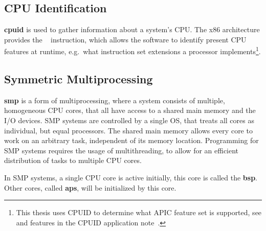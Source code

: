 \subsection{CPU Identification}
\label{subsec:cpuid}

\textbf{\gls{cpuid}} is used to gather information about a system's CPU\@.
The x86 architecture provides the ~\autocite{x86isa} instruction, which allows the software to identify present CPU features at runtime, e.g.\ what instruction set extensions a processor implements\footnote{
  This thesis uses CPUID to determine what APIC feature set is supported, see  and  features in the CPUID application note~\autocite[sec.~5.1.2]{cpuid}.}.

\subsection{Symmetric Multiprocessing}
\label{subsec:smp}

\textbf{\gls{smp}} is a form of multiprocessing, where a system consists of multiple, homogeneous CPU cores, that all have access to a shared main memory and the I/O devices.
SMP systems are controlled by a single OS, that treats all cores as individual, but equal processors.
The shared main memory allows every core to work on an arbitrary task, independent of its memory location.
Programming for SMP systems requires the usage of multithreading, to allow for an efficient distribution of tasks to multiple CPU cores.

In SMP systems, a single CPU core is active initially, this core is called the \textbf{\gls{bsp}}.
Other cores, called \textbf{\glspl{ap}}, will be initialized by this core.

%
%


